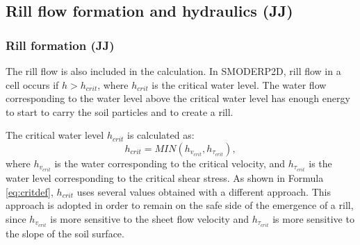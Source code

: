         \subsection{Rill flow formation and hydraulics (JJ)}


        \subsubsection{Rill formation (JJ)}

            The rill flow is also included in the calculation. In SMODERP2D, rill flow in a
            cell occurs if $h>h_{crit}$, where $h_{crit}$ is the critical water level. The
            water flow corresponding to the water level above the critical water level has
            enough energy to start to carry the soil particles and to create a rill.

            The critical water level $h_{crit}$ is calculated as:
            \begin{equation}
              h_{crit} = MIN(h_{v_{crit}},h_{\tau_{crit}}),
              \label{eq:critdef}
            \end{equation}
            where $h_{v_{crit}}$ is the water corresponding to the critical velocity, and
            $h_{\tau_{crit}}$ is the water level corresponding to the critical shear
            stress.  As shown in Formula \ref{eq:critdef}, $h_{crit}$ uses several values
            obtained with a different approach. This approach is adopted in order to remain
            on the safe side of the emergence of a rill, since $h_{v_{crit}}$ is more
            sensitive to the sheet flow velocity and $h_{\tau_{crit}}$ is more sensitive to
            the slope of the soil surface. 

